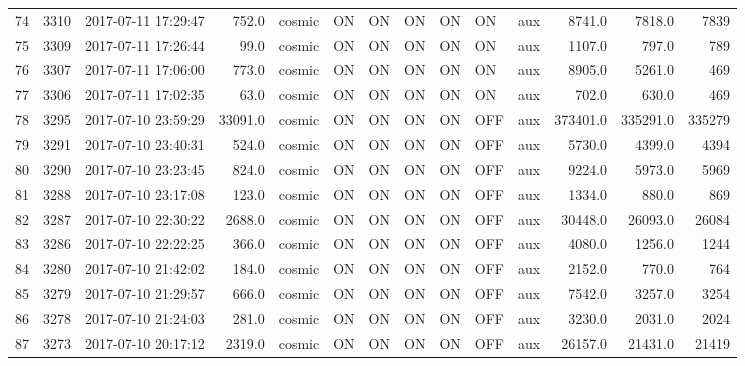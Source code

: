 \begin{tabular}{lrlrlllllllrrr}
74  &  3310 &  2017-07-11 17:29:47 &     752.0 &   cosmic &  ON &   ON &   ON &  ON &   ON &       aux &      8741.0 &       7818.0 &                7839 \\
75  &  3309 &  2017-07-11 17:26:44 &      99.0 &   cosmic &  ON &   ON &   ON &  ON &   ON &       aux &      1107.0 &        797.0 &                 789 \\
76  &  3307 &  2017-07-11 17:06:00 &     773.0 &   cosmic &  ON &   ON &   ON &  ON &   ON &       aux &      8905.0 &       5261.0 &                 469 \\
77  &  3306 &  2017-07-11 17:02:35 &      63.0 &   cosmic &  ON &   ON &   ON &  ON &   ON &       aux &       702.0 &        630.0 &                 469 \\
78  &  3295 &  2017-07-10 23:59:29 &   33091.0 &   cosmic &  ON &   ON &   ON &  ON &  OFF &       aux &    373401.0 &     335291.0 &              335279 \\
79  &  3291 &  2017-07-10 23:40:31 &     524.0 &   cosmic &  ON &   ON &   ON &  ON &  OFF &       aux &      5730.0 &       4399.0 &                4394 \\
80  &  3290 &  2017-07-10 23:23:45 &     824.0 &   cosmic &  ON &   ON &   ON &  ON &  OFF &       aux &      9224.0 &       5973.0 &                5969 \\
81  &  3288 &  2017-07-10 23:17:08 &     123.0 &   cosmic &  ON &   ON &   ON &  ON &  OFF &       aux &      1334.0 &        880.0 &                 869 \\
82  &  3287 &  2017-07-10 22:30:22 &    2688.0 &   cosmic &  ON &   ON &   ON &  ON &  OFF &       aux &     30448.0 &      26093.0 &               26084 \\
83  &  3286 &  2017-07-10 22:22:25 &     366.0 &   cosmic &  ON &   ON &   ON &  ON &  OFF &       aux &      4080.0 &       1256.0 &                1244 \\
84  &  3280 &  2017-07-10 21:42:02 &     184.0 &   cosmic &  ON &   ON &   ON &  ON &  OFF &       aux &      2152.0 &        770.0 &                 764 \\
85  &  3279 &  2017-07-10 21:29:57 &     666.0 &   cosmic &  ON &   ON &   ON &  ON &  OFF &       aux &      7542.0 &       3257.0 &                3254 \\
86  &  3278 &  2017-07-10 21:24:03 &     281.0 &   cosmic &  ON &   ON &   ON &  ON &  OFF &       aux &      3230.0 &       2031.0 &                2024 \\
87  &  3273 &  2017-07-10 20:17:12 &    2319.0 &   cosmic &  ON &   ON &   ON &  ON &  OFF &       aux &     26157.0 &      21431.0 &               21419 \\

\end{tabular}
